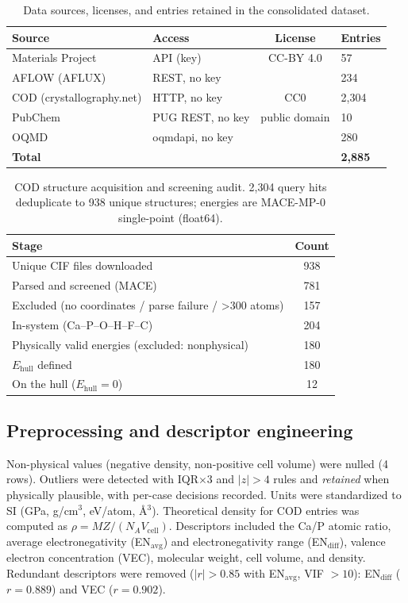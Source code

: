 \documentclass[11pt,a4paper]{article}
\begin{document}
\begin{table}[ht]
\centering\small
\caption{Data sources, licenses, and entries retained in the consolidated dataset.}
\label{tab:sumber}
\begin{tabular}{llcl}
\toprule
Source & Access & License & Entries \\
\midrule
Materials Project & API (key) & CC-BY 4.0 & 57 \\
AFLOW (AFLUX) & REST, no key & \cite{curtarolo2012} & 234 \\
COD (crystallography.net) & HTTP, no key & CC0 & 2{,}304 \\
PubChem & PUG REST, no key & public domain & 10 \\
OQMD & oqmdapi, no key & \cite{kirklin2015} & 280 \\
\midrule
\textbf{Total} & & & \textbf{2{,}885} \\
\bottomrule
\end{tabular}
\end{table}

\begin{table}[ht]
\centering\small
\caption{COD structure acquisition and screening audit. 2{,}304 query hits deduplicate to 938 unique structures; energies are MACE-MP-0 single-point (float64).}
\label{tab:cod_qc}
\begin{tabular}{lc}
\toprule
Stage & Count \\
\midrule
Unique CIF files downloaded & 938 \\
Parsed and screened (MACE) & 781 \\
Excluded (no coordinates / parse failure / >300 atoms) & 157 \\
In-system (Ca--P--O--H--F--C) & 204 \\
Physically valid energies (excluded: nonphysical) & 180 \\
$E_\mathrm{hull}$ defined & 180 \\
On the hull ($E_\mathrm{hull} = 0$) & 12 \\
\bottomrule
\end{tabular}
\end{table}

\subsection{Preprocessing and descriptor engineering}
Non-physical values (negative density, non-positive cell volume) were nulled (4 rows). Outliers were detected with IQR$\times$3 and $|z|>4$ rules and \emph{retained} when physically plausible, with per-case decisions recorded. Units were standardized to SI (GPa, g/cm$^3$, eV/atom, \AA$^3$). Theoretical density for COD entries was computed as $\rho = MZ/(N_A V_\mathrm{cell})$. Descriptors included the Ca/P atomic ratio, average electronegativity (EN$_\mathrm{avg}$) and electronegativity range (EN$_\mathrm{diff}$), valence electron concentration (VEC), molecular weight, cell volume, and density. Redundant descriptors were removed ($|r| > 0.85$ with EN$_\mathrm{avg}$, VIF $> 10$): EN$_\mathrm{diff}$ ($r=0.889$) and VEC ($r=0.902$).
\end{document}
